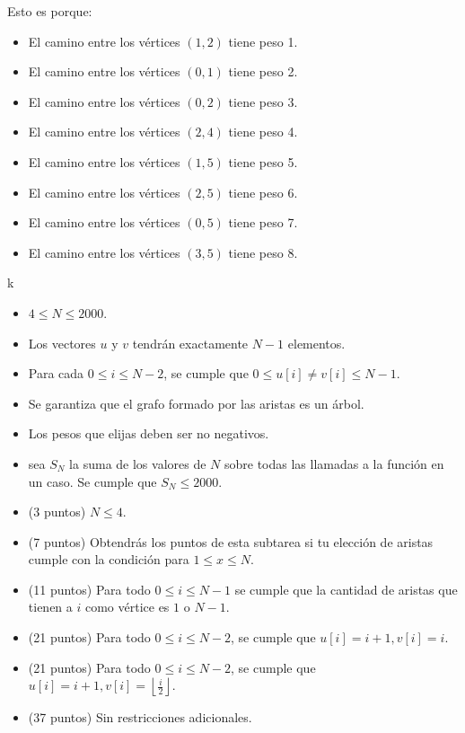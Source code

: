 \documentclass[12pt]{scrartcl}
\begin{document}
\begin{itemize}
\begin{center}
            \end{center}
            Esto es porque:
            \begin{itemize}
                \item El camino entre los vértices $(1, 2)$ tiene peso 1.
                \item El camino entre los vértices $(0, 1)$ tiene peso 2.
                \item El camino entre los vértices $(0, 2)$ tiene peso 3.
                \item El camino entre los vértices $(2, 4)$ tiene peso 4.
                \item El camino entre los vértices $(1, 5)$ tiene peso 5.
                \item El camino entre los vértices $(2, 5)$ tiene peso 6.
                \item El camino entre los vértices $(0, 5)$ tiene peso 7.
                \item El camino entre los vértices $(3, 5)$ tiene peso 8.
            \end{itemize}
        \end{itemize}
        k

        \begin{itemize}
            \item $4 \le N \le 2000$.
            \item Los vectores $u$ y $v$ tendrán exactamente $N - 1$ elementos.
            \item Para cada $0 \le i \le N - 2$, se cumple que $0 \le u[i] \neq v[i] \le N - 1$. 
            \item Se garantiza que el grafo formado por las aristas es un árbol.
            \item Los pesos que elijas deben ser no negativos.
            \item sea $S_N$ la suma de los valores de $N$ sobre todas las llamadas a la función en un caso. Se cumple que $S_N \le 2000$.
        \end{itemize}
    


    \begin{itemize}
        \item (3 puntos) $N \le 4$.
        \item (7 puntos) Obtendrás los puntos de esta subtarea si tu elección de aristas cumple con la condición para $1 \le x \le N$.
        \item (11 puntos) Para todo $0 \le i \le N - 1$  se cumple que la cantidad de aristas que tienen a $i$ como vértice es $1$ o $N - 1$.
        \item (21 puntos) Para todo $0 \le i \le N - 2$, se cumple que $u[i] = i + 1, v[i] = i$.
        \item (21 puntos) Para todo $0 \le i \le N - 2$, se cumple que $u[i] = i + 1, v[i] = \left\lfloor\frac{i}{2} \right\rfloor$.
        \item (37 puntos) Sin restricciones adicionales.
    \end{itemize}
\end{document}
